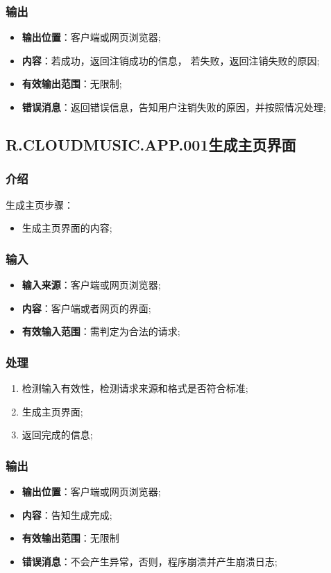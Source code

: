 \subsubsection{输出}
\begin{itemize}
	\item \textbf{输出位置}：客户端或网页浏览器;
	\item \textbf{内容}：若成功，返回注销成功的信息，
		若失败，返回注销失败的原因;
	\item \textbf{有效输出范围}：无限制;
	\item \textbf{错误消息}：返回错误信息，告知用户注销失败的原因，并按照情况处理;
\end{itemize}

\subsection{R.CLOUDMUSIC.APP.001生成主页界面}
\subsubsection{介绍}
生成主页步骤：
	\begin{itemize}
		\item 生成主页界面的内容;
	\end{itemize}
\subsubsection{输入}
	\begin{itemize}
		\item \textbf{输入来源}：客户端或网页浏览器;
		\item \textbf{内容}：客户端或者网页的界面;
		\item \textbf{有效输入范围}：需判定为合法的请求;
	\end{itemize}
\subsubsection{处理}
	\begin{enumerate}
		\item 检测输入有效性，检测请求来源和格式是否符合标准;
		\item 生成主页界面;
		\item 返回完成的信息;
	\end{enumerate}
\subsubsection{输出}
\begin{itemize}
	\item \textbf{输出位置}：客户端或网页浏览器;
	\item \textbf{内容}：告知生成完成;
	\item \textbf{有效输出范围}：无限制
	\item \textbf{错误消息}：不会产生异常，否则，程序崩溃并产生崩溃日志;
\end{itemize}

